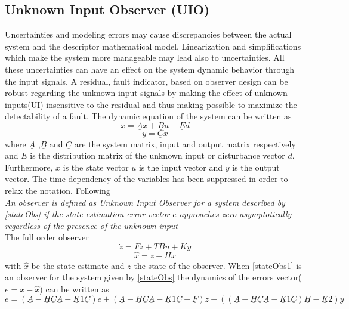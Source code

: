 \subsection{Unknown Input Observer (UIO)}
Uncertainties and modeling errors may cause discrepancies between the actual system and the descriptor mathematical model. Linearization and simplifications which make the system more manageable may lead also to uncertainties. All these uncertainties can have an effect on the system dynamic behavior through the input signals.   
A residual, fault indicator, based on observer design can be robust regarding the unknown input signals by making the effect of unknown inputs(UI) insensitive to the residual and thus making possible to maximize the detectability of a fault. The dynamic equation of the system can be written as
%
\begin{equation}
\dot{x} = \underline Ax+\underline B u+\underline Ed
\label{stateObs}
\end{equation}
\begin{equation}
y = \underline C x
\end{equation}
%
where $\underline A$ ,$\underline B$ and $ \underline C $ are the system matrix, input and output matrix respectively and $\underline E$ is the distribution matrix of the unknown input or disturbance vector $d$. Furthermore, $x$ is the state vector $u$ is the input vector and $y$ is the output vector. The time dependency of the variables has been suppressed in order to relax the notation. Following \cite{UIO} 
%
%
\\
\textit{An observer is defined as Unknown Input Observer for a system described by \eqref{stateObs} if the state estimation error vector $e$ approaches zero asymptotically regardless of the presence of the unknown input }
\\
The full order observer
\begin{equation}
\dot{z} = \underline Fz+\underline{TB} u+\underline Ky
\label{stateObs1}
\end{equation}
\begin{equation}
\hat{x} = z + \underline H x
\end{equation}
with $\hat{x}$ be the state estimate and $z$ the state of the observer. When \eqref{stateObs1} is an observer for the system given by \eqref{stateObs} the dynamics of the errors vector($e = x - \hat{x}$) can be written as\cite{UIO} 
%
\begin{equation}
\dot{e}= (\underline A-\underline H \underline C \underline A-\underline K1 \underline C)e + (\underline A-\underline H \underline C \underline A-\underline K1 \underline C - \underline F)z+ ((\underline A-\underline H \underline C \underline A-\underline K1 \underline C )\underline H-\underline K2)y
\label{errordynamics}
\end{equation}
